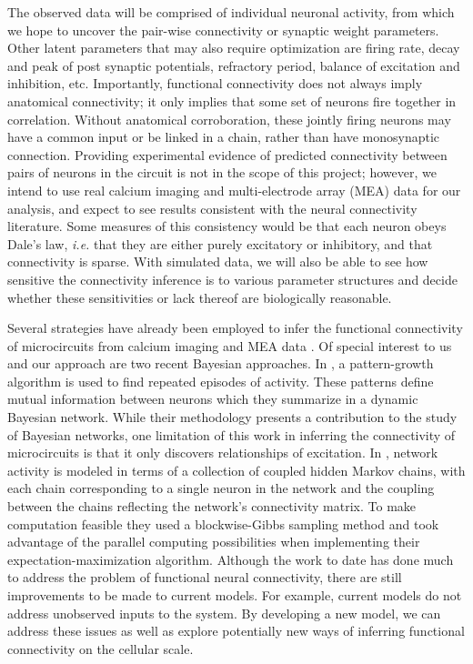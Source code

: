\documentclass{article}
\begin{document}
The observed data will be comprised of individual neuronal activity, from which we hope to uncover the pair-wise connectivity or synaptic weight parameters.  Other latent parameters that may also require optimization are firing rate, decay and peak of post synaptic potentials, refractory period, balance of excitation and inhibition, etc.  Importantly, functional connectivity
does not always imply anatomical connectivity; it only implies that
some set of neurons fire together in correlation.  Without anatomical
corroboration, these jointly firing neurons may have a common input
or be linked in a chain, rather than have monosynaptic connection.
Providing experimental evidence of predicted connectivity between
pairs of neurons in the circuit is not in the scope of this project;
however, we intend to use real calcium imaging and multi-electrode array (MEA) data for our
analysis, and expect to see results consistent with the neural
connectivity literature.  Some measures of this consistency would
be that each neuron obeys Dale’s law, \emph{i.e.} that they are either
purely excitatory or inhibitory, and that connectivity is sparse.
With simulated data, we will also be able to see how sensitive
the connectivity inference is to various parameter structures and
decide whether these sensitivities or lack thereof are biologically
reasonable.

Several strategies have already been employed to infer the functional
connectivity of microcircuits from calcium imaging and MEA data
\citep{Gerwinn2010, takahashi2007, aguiar2009}. Of special interest to us and our approach
are two recent Bayesian approaches. In \citep{patnaik2011}, 
a pattern-growth algorithm is used to find repeated episodes of
activity. These patterns define mutual information between neurons
which they summarize in a dynamic Bayesian network. While their
methodology presents a contribution to the study of Bayesian networks,
one limitation of this work in inferring the connectivity of
microcircuits is that it only discovers relationships of excitation. In \citep{mishchencko2011}, network activity is modeled in terms of a collection of coupled hidden Markov chains, with each chain
corresponding to a single neuron in the network and the coupling
between the chains reflecting the network’s connectivity matrix.
To make computation feasible they used a blockwise-Gibbs sampling
method and took advantage of the parallel computing possibilities
when implementing their expectation-maximization algorithm. Although the work to date has done much to address the problem of
functional neural connectivity, there are still improvements to be
made to current models. For example, current models do not address
unobserved inputs to the system. By developing a new model, we can address these issues as well as explore potentially new
ways of inferring functional connectivity on the cellular scale. 
\end{document}
